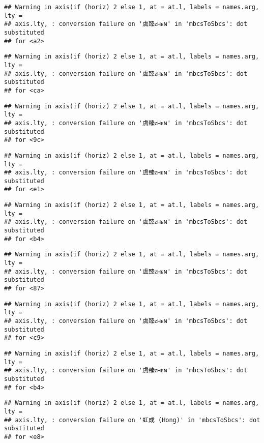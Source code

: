 \documentclass[
]{article}
\begin{document}
\begin{verbatim}
## Warning in axis(if (horiz) 2 else 1, at = at.l, labels = names.arg, lty =
## axis.lty, : conversion failure on '虞臻ᴢʜᴇɴ' in 'mbcsToSbcs': dot substituted
## for <a2>
\end{verbatim}

\begin{verbatim}
## Warning in axis(if (horiz) 2 else 1, at = at.l, labels = names.arg, lty =
## axis.lty, : conversion failure on '虞臻ᴢʜᴇɴ' in 'mbcsToSbcs': dot substituted
## for <ca>
\end{verbatim}

\begin{verbatim}
## Warning in axis(if (horiz) 2 else 1, at = at.l, labels = names.arg, lty =
## axis.lty, : conversion failure on '虞臻ᴢʜᴇɴ' in 'mbcsToSbcs': dot substituted
## for <9c>
\end{verbatim}

\begin{verbatim}
## Warning in axis(if (horiz) 2 else 1, at = at.l, labels = names.arg, lty =
## axis.lty, : conversion failure on '虞臻ᴢʜᴇɴ' in 'mbcsToSbcs': dot substituted
## for <e1>
\end{verbatim}

\begin{verbatim}
## Warning in axis(if (horiz) 2 else 1, at = at.l, labels = names.arg, lty =
## axis.lty, : conversion failure on '虞臻ᴢʜᴇɴ' in 'mbcsToSbcs': dot substituted
## for <b4>
\end{verbatim}

\begin{verbatim}
## Warning in axis(if (horiz) 2 else 1, at = at.l, labels = names.arg, lty =
## axis.lty, : conversion failure on '虞臻ᴢʜᴇɴ' in 'mbcsToSbcs': dot substituted
## for <87>
\end{verbatim}

\begin{verbatim}
## Warning in axis(if (horiz) 2 else 1, at = at.l, labels = names.arg, lty =
## axis.lty, : conversion failure on '虞臻ᴢʜᴇɴ' in 'mbcsToSbcs': dot substituted
## for <c9>
\end{verbatim}

\begin{verbatim}
## Warning in axis(if (horiz) 2 else 1, at = at.l, labels = names.arg, lty =
## axis.lty, : conversion failure on '虞臻ᴢʜᴇɴ' in 'mbcsToSbcs': dot substituted
## for <b4>
\end{verbatim}

\begin{verbatim}
## Warning in axis(if (horiz) 2 else 1, at = at.l, labels = names.arg, lty =
## axis.lty, : conversion failure on '虹成 (Hong)' in 'mbcsToSbcs': dot substituted
## for <e8>
\end{verbatim}
\end{document}
